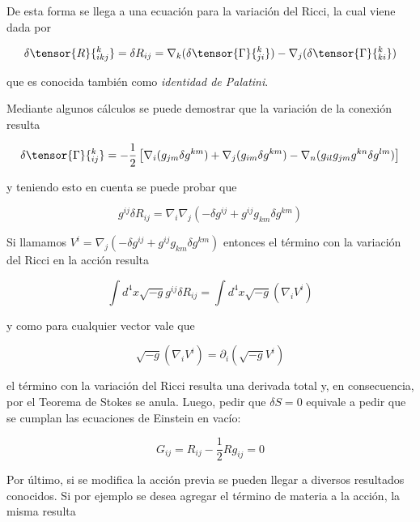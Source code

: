 De esta forma se llega a una ecuación para la variación del Ricci, la cual viene dada por

\begin{equation*}
    \delta\tensor{R}{^k_{ikj}}=\delta R_{ij}=\nabla_k(\delta\tensor{\Gamma}{^k_{ji}})-\nabla_j(\delta\tensor{\Gamma}{^k_{ki}})
\end{equation*}

que es conocida también como \textit{identidad de Palatini}.

Mediante algunos cálculos se puede demostrar que la variación de la conexión resulta

\begin{equation*}
    \delta\tensor{\Gamma}{^k_{ij}}=-\frac{1}{2}\left[ \nabla_i(g_{jm}\delta g^{km})+\nabla_j(g_{im}\delta g^{km})-\nabla_n(g_{il}g_{jm}g^{kn}\delta g^{lm}) \right]
\end{equation*}

y teniendo esto en cuenta se puede probar que

\begin{equation*}
    g^{ij}\delta R_{ij}=\nabla_i\nabla_j(-\delta g^{ij}+g^{ij}g_{km}\delta g^{km})
\end{equation*}

Si llamamos $V^i=\nabla_j(-\delta g^{ij}+g^{ij}g_{km}\delta g^{km})$ entonces el término con la variación del Ricci en la acción resulta

\begin{equation*}
	\int d^4x\sqrt{-g}g^{ij}\delta R_{ij}=\int d^4x\sqrt{-g} (\nabla_iV^i)
\end{equation*}

y como para cualquier vector vale que 

\begin{equation*}
	\sqrt{-g}(\nabla_iV^i)=\partial_i(\sqrt{-g}V^i)
\end{equation*}

el término con la variación del Ricci resulta una derivada total y, en consecuencia, por el Teorema de Stokes se anula. Luego, pedir que $\delta S=0$ equivale a pedir que se cumplan las ecuaciones de Einstein en vacío:

\begin{equation*}
	G_{ij}=R_{ij}-\frac{1}{2}Rg_{ij}=0
\end{equation*}

Por último, si se modifica la acción previa se pueden llegar a diversos resultados conocidos. Si por ejemplo se desea agregar el término de materia a la acción, la misma resulta


